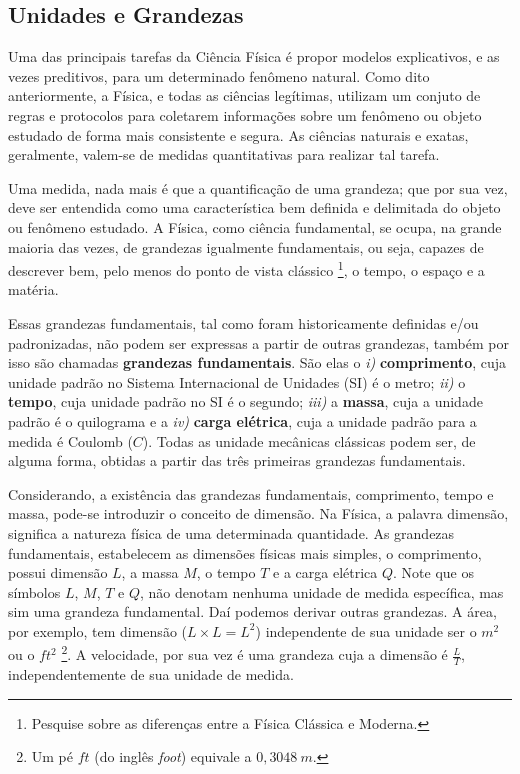\documentclass[a4paper, 11pt]{report}
\begin{document}
\subsection{Unidades e Grandezas}

Uma das principais tarefas da Ciência Física é propor modelos explicativos, e 
as vezes preditivos, para um determinado fenômeno natural. Como dito
anteriormente, a Física, e todas as ciências legítimas, utilizam um conjuto de 
regras e protocolos para coletarem informações sobre um fenômeno ou objeto 
estudado de forma mais consistente e segura. As ciências naturais e exatas, 
geralmente, valem-se de medidas quantitativas para realizar tal tarefa. 

Uma medida, nada mais é que a quantificação de uma grandeza; que por sua vez, 
deve ser entendida como uma característica bem definida e delimitada do objeto
ou fenômeno estudado. A Física, como ciência fundamental, se ocupa, na grande 
maioria das vezes, de grandezas igualmente fundamentais, ou seja, 
capazes de descrever bem, pelo menos do ponto de vista clássico \footnote{
    Pesquise sobre as diferenças entre a Física Clássica e Moderna.
}, o tempo, o espaço e a matéria.

Essas grandezas fundamentais, tal como foram historicamente definidas e/ou 
padronizadas, não podem ser expressas a partir de outras grandezas, também por 
isso são chamadas \textbf{grandezas fundamentais}. São elas o 
\emph{i)} \textbf{comprimento}, cuja unidade padrão no Sistema Internacional de
Unidades (SI) é o metro; \emph{ii)} o \textbf{tempo}, cuja unidade padrão no SI
é o segundo; \emph{iii)} a \textbf{massa}, cuja a unidade padrão é o quilograma
e a \emph{iv)} \textbf{carga elétrica}, cuja a unidade padrão para a medida é 
Coulomb ($C$). Todas as unidade mecânicas clássicas podem ser, de alguma forma, 
obtidas a partir das três primeiras grandezas fundamentais. 

Considerando, a existência das grandezas fundamentais, comprimento, tempo e 
massa, pode-se introduzir o conceito de dimensão. Na Física, a palavra dimensão, 
significa a natureza física de uma determinada quantidade. As grandezas 
fundamentais, estabelecem as dimensões físicas mais simples, o comprimento, 
possui dimensão $L$, a massa $M$, o tempo $T$ e a carga elétrica $Q$. Note que
os símbolos $L$, $M$, $T$ e $Q$, não denotam nenhuma unidade de medida 
específica, mas sim uma grandeza fundamental. Daí podemos derivar outras 
grandezas. A área, por exemplo, tem dimensão ($L \times L = L^2$) independente 
de sua unidade ser o $m^2$ ou o $ft^2$
\footnote{
    Um pé $ft$ (do inglês \emph{foot}) equivale a $0,3048\:m$.
}. A velocidade, por sua vez é uma grandeza cuja a dimensão é $\frac{L}{T}$, 
independentemente de sua unidade de medida. 
\end{document}

